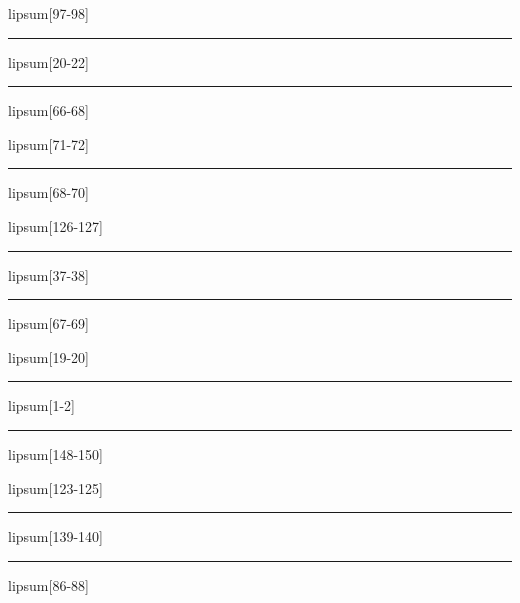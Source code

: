 \documentclass[11pt,a4paper]{article}
\begin{document}
lipsum[97-98]

\begin{simplewrap}
  \textcolor{cyan!17}{\rule{5.1cm}{4.0cm}}
\end{simplewrap}
lipsum[20-22]

\begin{simplewrap}
  \textcolor{teal!59}{\rule{4.3cm}{9.2cm}}
\end{simplewrap}
lipsum[66-68]

lipsum[71-72]

\begin{simplewrap}
  \textcolor{blue!34}{\rule{4.2cm}{10.0cm}}
\end{simplewrap}
lipsum[68-70]

lipsum[126-127]

\begin{simplewrap}
  \textcolor{yellow!49}{\rule{4.2cm}{7.2cm}}
\end{simplewrap}
lipsum[37-38]

\begin{simplewrap}
  \textcolor{olive!23}{\rule{4.8cm}{2.8cm}}
\end{simplewrap}
lipsum[67-69]

lipsum[19-20]

\begin{simplewrap}
  \textcolor{teal!59}{\rule{4.3cm}{9.2cm}}
\end{simplewrap}
lipsum[1-2]

\begin{simplewrap}
  \textcolor{pink!27}{\rule{3.5cm}{4.6cm}}
\end{simplewrap}
lipsum[148-150]

lipsum[123-125]

\begin{simplewrap}
  \textcolor{olive!35}{\rule{5.5cm}{8.2cm}}
\end{simplewrap}
lipsum[139-140]

\begin{simplewrap}
  \textcolor{pink!54}{\rule{5.5cm}{5.9cm}}
\end{simplewrap}
lipsum[86-88]
\end{document}
